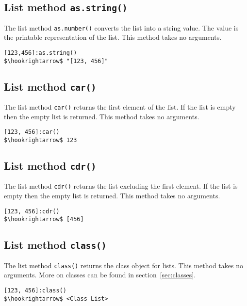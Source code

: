 \documentclass[11pt,a4paper]{scrbook}
\newcommand\method[1]{\texttt{#1}}
\begin{document}
\subsection{List method \method{as.string()}}

The list method \method{as.number()} converts the list into a string value.
The value is the printable representation of the list. This method takes no
arguments.

\begin{lstlisting}[language=BibTool,mathescape=true]
[123,456]:as.string()
$\hookrightarrow$ "[123, 456]"
\end{lstlisting}

\subsection{List method \method{car()}}

The list method \method{car()} returns the first element of the list. If the
list is empty then the empty list is returned. This method takes no arguments.

\begin{lstlisting}[language=BibTool,mathescape=true]
[123, 456]:car()
$\hookrightarrow$ 123
\end{lstlisting}

\subsection{List method \method{cdr()}}

The list method \method{cdr()} returns the list excluding the first element.
If the list is empty then the empty list is returned. This method takes no
arguments.

\begin{lstlisting}[language=BibTool,mathescape=true]
[123, 456]:cdr()
$\hookrightarrow$ [456]
\end{lstlisting}

\subsection{List method \method{class()}}

The list method \method{class()} returns the class object for lists. This
method takes no arguments. More on classes can be found in
section~\ref{sec:classes}.

\begin{lstlisting}[language=BibTool,mathescape=true]
[123, 456]:class()
$\hookrightarrow$ <Class List>
\end{lstlisting}
\end{document}
